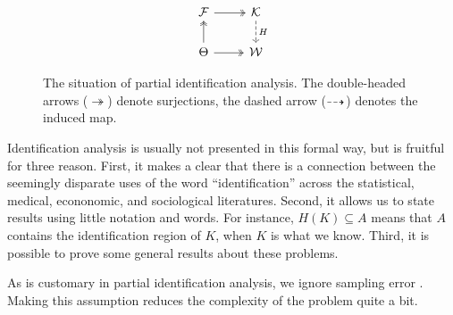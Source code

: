 \begin{figure}
\noindent \begin{centering}
\[
\begin{tikzcd}
\mathcal{F} \arrow[twoheadrightarrow]{r} & \mathcal{K} \arrow[dashed]{d}{H} \\
\Theta      \arrow[twoheadrightarrow]{u} \arrow[twoheadrightarrow]{r}  & \mathcal{W}
\end{tikzcd}
\]
\par\end{centering}
\caption{\label{fig:partial identifiaction situation-1}The situation of partial
identification analysis. The double-headed arrows ($\twoheadrightarrow$)
denote surjections, the dashed arrow ($\protect\dashrightarrow$)
denotes the induced map.}
\end{figure}

Identification analysis is usually not presented in this formal way, but is fruitful for three reason. First, it makes a clear that there is a connection between the seemingly disparate uses of the word ``identification'' across the statistical, medical, econonomic, and sociological literatures.
Second, it allows us to state results using little notation and words. For instance, $H(K)\subseteq A$ means that $A$ contains the identification region of $K$, when $K$ is what we know. Third, it is possible to prove some general results about these problems.

As is customary in partial identification analysis, we ignore sampling error \parencite{Manski2003-aq}. Making this assumption reduces the complexity of the problem quite a bit. 

